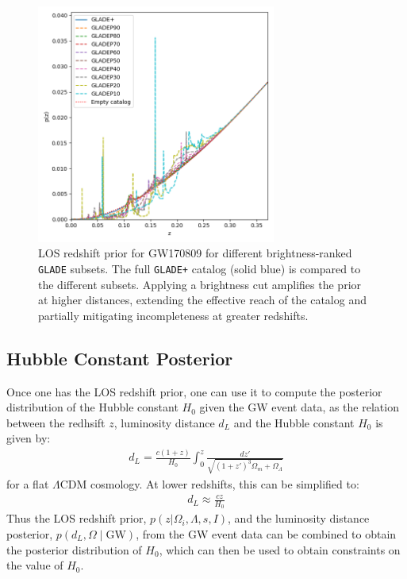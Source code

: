 \begin{figure}[ht]
  \centering
  \includegraphics[width=0.7\textwidth]{figures/GW170809_zprior.png}
  \caption[LOS redshift prior for GW170809 for different brightness-ranked \texttt{GLADE} subsets]{LOS redshift prior for GW170809 for different brightness-ranked \texttt{GLADE} subsets. The full \texttt{GLADE+} catalog (solid blue) is compared to the different subsets. Applying a brightness cut amplifies the prior at higher distances, extending the effective reach of the catalog and partially mitigating incompleteness at greater redshifts.}
  \label{fig:los_prior_gw170809}
\end{figure}

\subsection{Hubble Constant Posterior}
Once one has the \ac{LOS} redshift prior, one can use it to compute the posterior distribution of the Hubble constant $H_0$ given the \ac{GW} event data, as the relation between the redhsift $z$, luminosity distance $d_L$ and the Hubble constant $H_0$ is given by:
\begin{align}
  d_L = \frac{c(1+z)}{H_0} \int_0^z \frac{dz'}{\sqrt{(1+z')^3\Omega_m + \Omega_\Lambda}}
\end{align}
for a flat $\Lambda$CDM cosmology. At lower redshifts, this can be simplified to:
\begin{align}
  d_L \approx \frac{cz}{H_0}
\end{align}
Thus the \ac{LOS} redshift prior, $p(z|\Omega_i, \Lambda, s, I)$, and the luminosity distance posterior, $p(d_L,\Omega\mid\mathrm{GW})$, from the \ac{GW} event data can be combined to obtain the posterior distribution of $H_0$, which can then be used to obtain constraints on the value of $H_0$.

